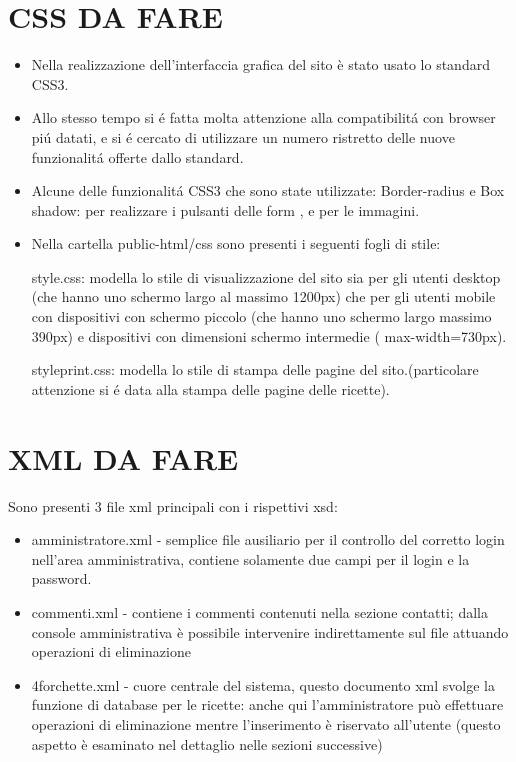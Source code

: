 \documentclass[12pt]{article}
\begin{document}
	\section{CSS DA FARE}
			\begin{itemize}
				\item Nella realizzazione dell'interfaccia grafica del sito è stato usato lo standard CSS3.
				\item Allo stesso tempo si \'e fatta molta attenzione alla compatibilit\'a con browser pi\'u datati, e si \'e cercato di utilizzare un numero ristretto delle nuove funzionalit\'a offerte dallo standard.
				
				\item Alcune delle funzionalit\'a CSS3 che sono state utilizzate:
				Border-radius e Box shadow: per realizzare i pulsanti delle form , e per le immagini.
				
			
				\item Nella cartella public-html/css sono presenti i seguenti fogli di stile:

				\subitem style.css: modella lo stile di visualizzazione del sito sia per gli utenti desktop (che hanno uno schermo largo al massimo 1200px) che per gli utenti mobile con dispositivi con schermo piccolo (che hanno uno schermo largo massimo 390px) e dispositivi con dimensioni schermo intermedie ( max-width=730px).


				\subitem styleprint.css: modella lo stile di stampa delle pagine del sito.(particolare attenzione si \'e data alla stampa delle pagine delle ricette).

\end{itemize}
					\newpage
				
		\section{XML DA FARE}
		Sono presenti 3 file xml principali con i rispettivi xsd:

		\begin{itemize}
		\item  amministratore.xml - semplice file ausiliario per il controllo del corretto login nell'area amministrativa, contiene solamente due campi per il login e la password.
		
		\item commenti.xml - contiene i commenti contenuti nella sezione contatti; dalla console amministrativa è possibile intervenire indirettamente sul file attuando operazioni di eliminazione
		
		\item 4forchette.xml - cuore centrale del sistema, questo documento xml svolge la funzione di database per le ricette: anche qui l'amministratore può effettuare operazioni di eliminazione mentre l'inserimento è riservato all'utente (questo aspetto \`e esaminato nel dettaglio nelle sezioni successive)
		\end{itemize}				
					
\end{document}
